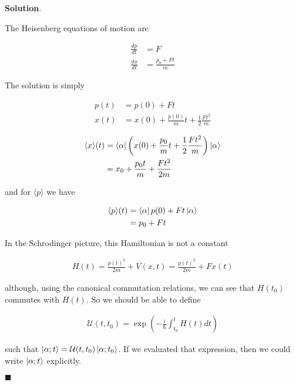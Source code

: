 \documentclass[12pt]{article}
\theoremstyle{definition}
\newenvironment{s}{%
        \begin{trivlist} \item \textbf{Solution}. }{%
            \hspace*{\fill} $\blacksquare$\end{trivlist}}%
\begin{document}
{\begin{s}

The Heisenberg equations of motion are

\begin{align*}
\frac{dp}{dt} &= F\\
\frac{dx}{dt} &= \frac{p_{0}+Ft}{m}
\end{align*}

The solution is simply

\begin{align*}
p(t) &= p(0) + Ft\\
x(t) &= x(0) + \frac{p(0)}{m}t + \frac{1}{2}\frac{Ft^{2}}{m}
\end{align*}

\begin{align*}
\langle x \rangle (t) &= \bra{\alpha} \left(x(0) + \frac{p_{0}}{m}t + \frac{1}{2}\frac{Ft^{2}}{m}\right)\ket{\alpha}\\
&= x_{0} + \frac{p_{0}t}{m} + \frac{Ft^{2}}{2m}
\end{align*}

and for $\langle p\rangle$ we have

\begin{align*}
\langle p \rangle (t) &= \bra{\alpha} p(0) + Ft\ket{\alpha}\\
&= p_{0} + Ft
\end{align*}

In the Schrodinger picture, this Hamiltonian is not a constant

\begin{align*}
H(t) = \frac{p(t)^{2}}{2m} + V(x,t) = \frac{p(t)^{2}}{2m} + Fx(t)
\end{align*}

although, using the canonical commutation relations, we can see that $H(t_{0})$ commutes with $H(t)$. So we should be able to define

\begin{align*}
\mathcal{U}(t,t_{0}) = \exp\left(-\frac{i}{\hbar}\int_{t_{0}}^{t} H(t)dt\right)
\end{align*}

such that $\ket{\alpha;t} = \mathcal{U}(t,t_{0}) \ket{\alpha;t_{0}}$. If we evaluated that expression, then we could write $\ket{\alpha;t}$ explicitly.

\end{s}
\end{document}
